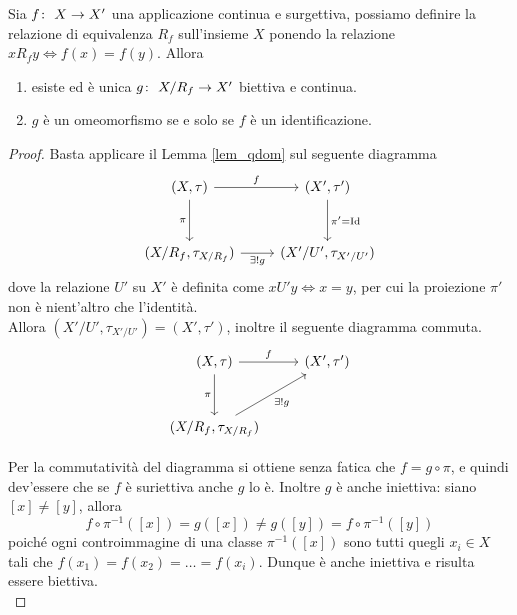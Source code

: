 \begin{theorem}
	Sia  $f \colon\ X \rightarrow X'$ una applicazione continua e surgettiva, possiamo definire la relazione di equivalenza $R_f$ sull'insieme $X$ ponendo la relazione $xR_fy \Leftrightarrow f(x) = f(y)$. Allora 
	\begin{enumerate}
		\item esiste ed è unica $g \colon\ X/R_f \rightarrow X'$ biettiva e continua.
		\item $g$ è un omeomorfismo se e solo se $f$ è un identificazione.
	\end{enumerate}
\end{theorem}
\begin{proof}
	Basta applicare il Lemma \ref{lem_qdom} sul seguente diagramma
	\begin{equation*}
	\begin{tikzcd}[row sep = 3em]
		(X, \tau) \arrow[swap]{d}{\pi} \arrow{r}{f} & (X', \tau') \arrow{d}{\pi' = \operatorname{Id}}\\
		(X/R_f, \tau_{X/R_f}) \arrow[swap]{r}{\exists! g} & (X'/U', \tau_{X'/U'})
	\end{tikzcd}	
	\end{equation*}
	dove la relazione $U'$ su $X'$ è definita come $xU'y \Leftrightarrow x = y$, per cui la proiezione $\pi'$ non è nient'altro che l'identità. \\ Allora $(X'/U', \tau_{X'/U'}) = (X', \tau')$, inoltre il seguente diagramma commuta. 
	\begin{equation*}
	\begin{tikzcd}[row sep = 3em]
		(X, \tau) \arrow[swap]{d}{\pi} \arrow{r}{f} & (X', \tau') \\
		(X/R_f, \tau_{X/R_f}) \arrow[swap]{ru}{\exists! g} &
	\end{tikzcd}	
	\end{equation*}
	
	Per la commutatività del diagramma si ottiene senza fatica che $f = g \circ \pi$, e quindi dev'essere che se $f$ è suriettiva anche $g$ lo è. Inoltre $g$ è anche iniettiva: siano $\left[x\right] \neq \left[y\right]$, allora 
	\begin{equation*}
		f \circ \pi^{-1} (\left[x\right]) = g(\left[x\right]) \neq g(\left[y\right]) = f \circ \pi^{-1}(\left[y\right])
	\end{equation*}	
	poiché ogni controimmagine di una classe $\pi^{-1}(\left[x\right])$ sono tutti quegli $x_i \in X$ tali che $f(x_1) = f(x_2) = \dots = f(x_i)$. Dunque è anche iniettiva e risulta essere biettiva.\\
	

\end{proof}
